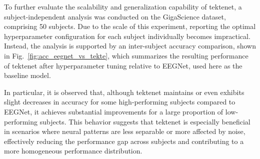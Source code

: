 To further evaluate the scalability and generalization capability of \gls{tektenet}, a subject-independent analysis was conducted on the GigaScience dataset, comprising 50 subjects. Due to the scale of this experiment, reporting the optimal hyperparameter configuration for each subject individually becomes impractical. Instead, the analysis is supported by an inter-subject accuracy comparison, shown in Fig.~\ref{fig:acc_eegnet_vs_tekte}, which summarizes the resulting performance of \gls{tektenet} after hyperparameter tuning relative to EEGNet, used here as the baseline model.

In particular, it is observed that, although \gls{tektenet} maintains or even exhibits slight decreases in accuracy for some high-performing subjects compared to EEGNet, it achieves substantial improvements for a large proportion of low-performing subjects. This behavior suggests that \gls{tektenet} is especially beneficial in scenarios where neural patterns are less separable or more affected by noise, effectively reducing the performance gap across subjects and contributing to a more homogeneous performance distribution.

